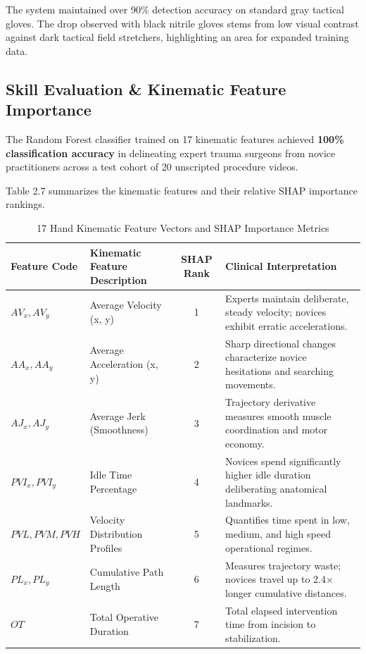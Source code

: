 \documentclass[12pt,a4paper]{report}
\begin{document}
The system maintained over 90\% detection accuracy on standard gray tactical gloves. The drop observed with black nitrile gloves stems from low visual contrast against dark tactical field stretchers, highlighting an area for expanded training data.

\subsection{Skill Evaluation \& Kinematic Feature Importance}
The Random Forest classifier trained on 17 kinematic features achieved \textbf{100\% classification accuracy} in delineating expert trauma surgeons from novice practitioners across a test cohort of 20 unscripted procedure videos.

Table 2.7 summarizes the kinematic features and their relative SHAP importance rankings.

\begin{table}[htbp]
\centering
\caption{17 Hand Kinematic Feature Vectors and SHAP Importance Metrics}
\label{tab:kinematic_features}
\small
\begin{tabularx}{\textwidth}{@{}l p{4.2cm} c X@{}}
\toprule
\textbf{Feature Code} & \textbf{Kinematic Feature Description} & \textbf{SHAP Rank} & \textbf{Clinical Interpretation} \\
\midrule
$AV_x, AV_y$ & Average Velocity (x, y) & 1 & Experts maintain deliberate, steady velocity; novices exhibit erratic accelerations. \\
$AA_x, AA_y$ & Average Acceleration (x, y) & 2 & Sharp directional changes characterize novice hesitations and searching movements. \\
$AJ_x, AJ_y$ & Average Jerk (Smoothness) & 3 & Trajectory derivative measures smooth muscle coordination and motor economy. \\
$PVI_x, PVI_y$ & Idle Time Percentage & 4 & Novices spend significantly higher idle duration deliberating anatomical landmarks. \\
$PVL, PVM, PVH$ & Velocity Distribution Profiles & 5 & Quantifies time spent in low, medium, and high speed operational regimes. \\
$PL_x, PL_y$ & Cumulative Path Length & 6 & Measures trajectory waste; novices travel up to 2.4$\times$ longer cumulative distances. \\
$OT$ & Total Operative Duration & 7 & Total elapsed intervention time from incision to stabilization. \\
\bottomrule
\end{tabularx}
\end{table}
\end{document}
